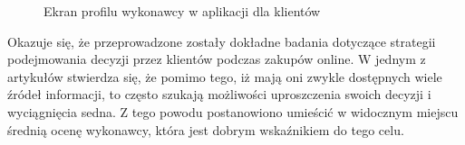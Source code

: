 \begin{figure}[ht!]
\begin{subfigure}[t]{0.32\textwidth}
  \end{subfigure}
  \caption[Ekran profilu wykonawcy]{Ekran profilu wykonawcy w aplikacji dla klientów}
  \label{fig:profile}
\end{figure}

Okazuje się, że przeprowadzone zostały dokładne badania dotyczące strategii podejmowania decyzji przez klientów podczas zakupów online. W jednym z artykułów \cite{ratings-presentation} stwierdza się, że pomimo tego, iż mają oni zwykle dostępnych wiele źródeł informacji, to często szukają możliwości uproszczenia swoich decyzji i wyciągnięcia sedna. Z tego powodu postanowiono umieścić w widocznym miejscu średnią ocenę wykonawcy, która jest dobrym wskaźnikiem do tego celu.

